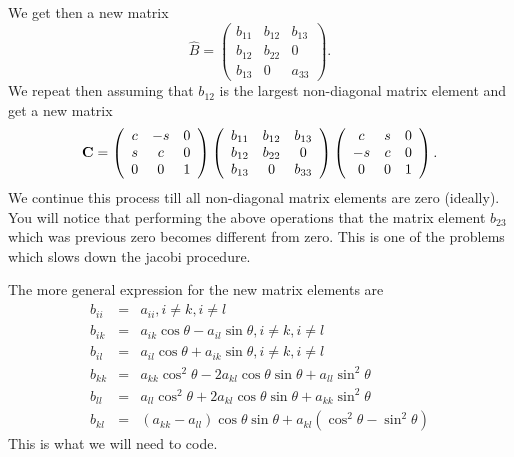 We get then a new matrix
\[
 \hat{B} =\left( \begin{array}{ccc} 
                b_{11} & b_{12}& b_{13}    \\
                b_{12}& b_{22}& 0    \\
                b_{13}& 0& a_{33}
             \end{array} \right).
\]
We repeat then assuming that $b_{12}$ is the largest non-diagonal matrix element and get a
new matrix 
\[
 {\bf C} =
      \left( \begin{array}{ccc} 
                c & -s & 0    \\
                s & c & 0     \\
                0 & 0 & 1
             \end{array} \right)\left( \begin{array}{ccc} 
                b_{11} & b_{12} & b_{13}    \\
                b_{12} & b_{22} & 0     \\
                b_{13} & 0 & b_{33}
             \end{array} \right)
              \left( \begin{array}{ccc} 
                c & s & 0    \\
                -s & c & 0     \\
                0 & 0 & 1
             \end{array} \right).
\]
We continue this process till all non-diagonal matrix elements are zero (ideally).
You will notice that performing the above operations that the matrix element 
$b_{23}$ which was previous zero becomes different from zero.  This is one of the problems which slows
down the jacobi procedure.


The more general expression for the new matrix elements are
\begin{eqnarray*}
b_{ii} &=& a_{ii}, i \ne k, i \ne l \\
b_{ik} &=& a_{ik}\cos\theta - a_{il}\sin\theta , i \ne k, i \ne l \\
b_{il} &=& a_{il}\cos\theta + a_{ik}\sin\theta , i \ne k, i \ne l \nonumber\\
b_{kk} &=& a_{kk}\cos^2\theta - 2a_{kl}\cos\theta \sin\theta +a_{ll}\sin^2\theta\nonumber\\
b_{ll} &=& a_{ll}\cos^2\theta +2a_{kl}\cos\theta \sin\theta +a_{kk}\sin^2\theta\nonumber\\
b_{kl} &=& (a_{kk}-a_{ll})\cos\theta \sin\theta +a_{kl}(\cos^2\theta-\sin^2\theta)\nonumber 
\end{eqnarray*}
This is what we will need to code.


